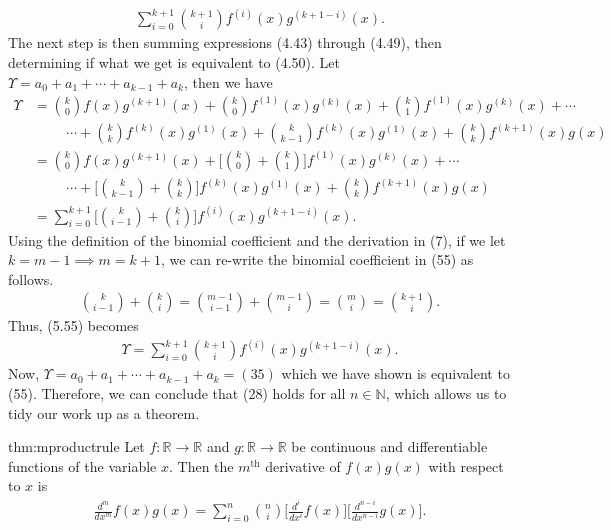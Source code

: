 \begin{align}
	\sum_{i=0}^{k+1}{{k+1}\choose{i}}f^{(i)}(x) g^{(k+1-i)}(x) .
\end{align}
The next step is then summing expressions (4.43) through (4.49), then determining if what we get is equivalent to (4.50). Let $\Upsilon=a_0+a_1+\cdots+a_{k-1}+a_k$, then we have
\begin{align}
	\Upsilon&={{k}\choose{0}}f(x)g^{(k+1)}(x)+{{k}\choose{0}}f^{(1)}(x)g^{(k)}(x)+{{k}\choose{1}}f^{(1)}(x)g^{(k)}(x)+\cdots\\
	&\hspace{1cm}\cdots+{{k}\choose{k}}f^{(k)}(x)g^{(1)}(x)+{{k}\choose{k-1}}f^{(k)}(x)g^{(1)}(x)+{{k}\choose{k}}f^{(k+1)}(x)g(x) \\
	&={{k}\choose{0}}f(x)g^{(k+1)}(x)+\bigg[{{k}\choose{0}}+{{k}\choose{1}} \bigg]f^{(1)}(x)g^{(k)}(x)+\cdots\\
	&\hspace{1cm}\cdots+\bigg[{{k}\choose{k-1}}+{{k}\choose{k}} \bigg]f^{(k)}(x)g^{(1)}(x)+{{k}\choose{k}}f^{(k+1)}(x)g(x)\\
	&=\sum_{i=0}^{k+1}\bigg[{{k}\choose{i-1}}+{{k}\choose{i}} \bigg]f^{(i)}(x)g^{(k+1-i)}(x).
\end{align}
Using the definition of the binomial coefficient and the derivation in (7), if we let $k=m-1 \implies m=k+1$, we can re-write the binomial coefficient in (55) as follows.
\begin{align}
	{{k}\choose{i-1}}+{{k}\choose{i}}={{m-1}\choose{i-1}}+{{m-1}\choose{i}}={{m}\choose{i}}={{k+1}\choose{i}}.
\end{align}
Thus, (5.55) becomes
\begin{align}
	\Upsilon=\sum_{i=0}^{k+1}{{k+1}\choose{i}}f^{(i)}(x)g^{(k+1-i)}(x).
\end{align}
Now, $\Upsilon=a_0+a_1+\cdots+a_{k-1}+a_k=(35)$ which we have shown is equivalent to (55). Therefore, we can conclude that (28) holds for all $n\in\mathbb{N}$, which allows us to tidy our work up as a theorem.
\begin{theo}{thm:mproductrule}
	Let $f:\mathbb{R}\rightarrow\mathbb{R}$ and $g:\mathbb{R}\rightarrow\mathbb{R}$ be continuous and differentiable functions of the variable $x$. Then the $m^{\textrm{th}}$ derivative of $f(x)g(x)$ with respect to $x$ is
	\begin{align*}
		\frac{d^m}{dx^m}f(x)g(x)=\sum_{i=0}^{n}{{n}\choose{i}}\bigg[\frac{d^i}{dx^i}f(x) \bigg]\bigg[\frac{d^{n-i}}{dx^{n-i}}g(x) \bigg].
	\end{align*}
\end{theo}































